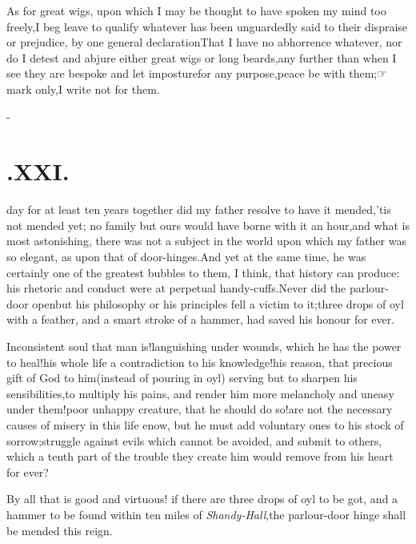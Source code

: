 \documentclass{article}
\begin{document}
As for great wigs, upon which I may be thought to have spoken my
mind too freely,\tsh I beg leave to qualify whatever has
been unguardedly said to their dispraise or prejudice, by one
general declaration\tsk That I have no abhorrence whatever,
nor do I detest and abjure either great wigs or long beards,\tsk any
further than when I see they are bespoke and let  imposture\tsk for any
purpose,\tsk peace be with them;\tsk ☞ mark
only,\tsk I write not for them.

\null\kern-\baselineskip
\section{.\quad  XXI.}

 day for at least ten years together did my
father resolve to have it mended,\tsh ’tis not mended yet;\tsh\break
no family but ours would have borne with it an hour,\tsk and
what is most asto\-nishing, there was not a subject in the world
upon which my father was so \sic elegant, as upon that of
door-hinges.\tsh\break And yet at the same time, he was certain\-ly one
of the greatest bubbles to them, I think, that history can
produce: his rhe\-toric and conduct were at perpetual
handy-cuffs.\tsk Never did the parlour-door open\tsk but his
philosophy or his principles fell a victim to it;\tsh three
drops of oyl with a feather, and a smart stroke of a hammer, had
saved his honour for ever.\etp{}

\tsh Inconsistent soul that man is!\tsh languishing under
wounds, which he has the power to heal!\tsk his whole life a
contradiction to his knowledge!\tsk his reason, that precious
gift of God to him\tsk (instead of pouring in oyl) serving but
to sharpen his sensibilities,\tsk to multiply his pains, and
render him more melancholy and uneasy under them!\tsk poor
unhappy creature, that he should do so!\tsh are not the
necessary causes of misery in this life enow, but he must add
voluntary ones to his stock of sorrow;\tsk struggle against
evils which cannot be avoided, and submit to others, which a
tenth part of the trouble they create him would remove from his
heart for ever?

By all that is good and virtuous! if there are three drops of
oyl to be got, and a hammer to be found within ten miles of
\textit{Shandy-Hall},\tsk the parlour-door hinge shall be
mended this reign.
\end{document}
